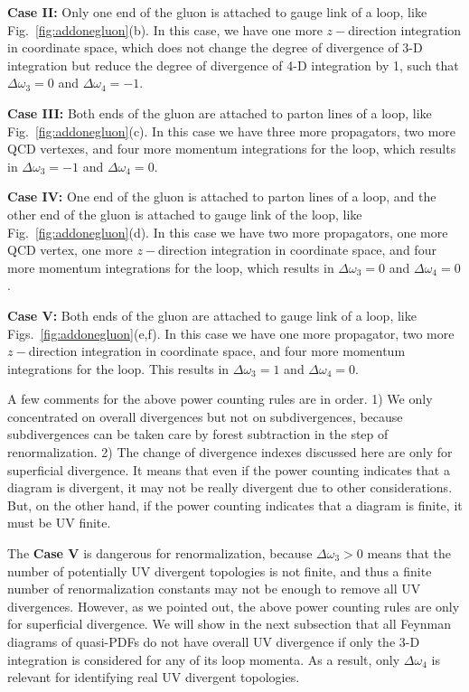 \documentclass[twocolumn,aps,prd,superscriptaddress,nofootinbib,showpacs]{revtex4}
\begin{document}
\textbf{Case II:} Only one end of the gluon is attached to gauge link of a loop, like Fig.~\ref{fig:addonegluon}(b). In this case, we have one more $z-$direction integration in coordinate space, which does not change the degree of divergence of 3-D integration but reduce the degree of divergence of 4-D integration by 1, such that $\Delta\omega_3=0$ and $\Delta\omega_4=-1$.

\textbf{Case III:} Both ends of the gluon are attached to parton lines of a loop, like Fig.~\ref{fig:addonegluon}(c). In this case we have three more propagators, two more QCD vertexes, and four more momentum integrations for the loop, which results in $\Delta\omega_3=-1$ and $\Delta\omega_4=0$.

\textbf{Case IV:} One end of the gluon is attached to parton lines of a loop, and the other end of the gluon is attached to gauge link of the loop, like Fig.~\ref{fig:addonegluon}(d). In this case we have two more propagators, one more QCD vertex, one more $z-$direction integration in coordinate space, and four more momentum integrations for the loop, which results in $\Delta\omega_3=0$ and $\Delta\omega_4=0$.

\textbf{Case V:} Both ends of the gluon are attached to gauge link of a loop, like Figs.~\ref{fig:addonegluon}(e,f). In this case we have one more propagator, two more $z-$direction integration in coordinate space, and four more momentum integrations for the loop. This results in $\Delta\omega_3= 1$ and $\Delta\omega_4=0$.

A few comments for the above power counting rules are in order.
1) We only concentrated on overall divergences but not on subdivergences, because subdivergences can be taken care by forest subtraction in the step of renormalization. 2) The change of divergence indexes discussed here are only for superficial divergence. It means that even if the power counting indicates that a diagram is divergent, it may not be really divergent due to other considerations. But, on the other hand, if the power counting indicates that a diagram is finite, it must be UV finite.

The \textbf{Case V} is dangerous for renormalization, because $\Delta\omega_3>0$ means that the number of potentially UV divergent topologies is not finite, and thus a finite number of renormalization constants may not be enough to remove all UV divergences. However, as we pointed out, the above power counting rules are only for superficial divergence. We will show in the next subsection that all Feynman diagrams of quasi-PDFs do not have overall UV divergence if only the 3-D integration is considered for any of its loop momenta. As a result, only $\Delta\omega_4$ is relevant for identifying real UV divergent topologies.
\end{document}
